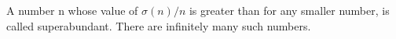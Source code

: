  A number n whose value of $ \sigma (n) / n $ is greater than
for any smaller number, is called superabundant. There
are infinitely many such numbers.
